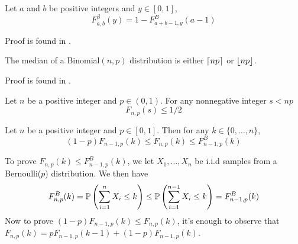 \begin{lemma} \label{fact:equation_for_beta_binomial_cdfs}
	Let $a$ and $b$ be positive integers and $y \in [0,1]$, 
	\[
	F^\beta_{a,b}(y) = 1 - F^B_{a+b-1,y}(a-1)
	\]
\end{lemma}
\begin{myproof}[Proof.]
	Proof is found in \cite{agrawalanalysis}.
\end{myproof}
\begin{lemma} \label{fact:median_of_binomial_dist}
	The median of a Binomial$(n,p)$ distribution is either $\ceil{np}$ or $\floor{np}$.
\end{lemma}
\begin{myproof}[Proof]
	Proof is found in \cite{jogdeo1968monotone}.
\end{myproof}

\begin{corollary} \label{cor:corollarly_of_binomial_median_property}
	Let $n$ be a positive integer and $p \in (0,1)$. For any nonnegative integer $s < np$
	\[
	F_{n,p}(s) \le 1/2
	\]
\end{corollary}

\begin{lemma} \label{fact:relationship_with_binom_cdfs}
	Let $n$ be a positive integer and $p \in [0,1]$. Then for any $k \in \{0,\ldots,n\}$,
	\[
	(1-p)F_{n-1,p}(k)\le F_{n,p}(k) \le F^B_{n-1,p}(k)
	\] 
\end{lemma}
\begin{myproof}[Proof]
	To prove $F_{n,p}(k) \le F^B_{n-1,p}(k)$, we let $X_1,\ldots,X_{n}$ be i.i.d samples from a Bernoulli($p$) distribution. We then have
	\begin{align*}
	F^B_{n,p}(k)  = \P{\sum_{i=1}^{n} X_i \le k}  \le  \P{\sum_{i=1}^{n-1} X_i \le k}  = F^B_{n-1,p}(k)
	\end{align*}
	Now to prove $(1-p)F_{n-1,p}(k)\le F_{n,p}(k)$, it's enough to observe that $F_{n,p}(k) = p F_{n-1,p}(k-1) + (1-p) F_{n-1,p}(k)$.
\end{myproof}

